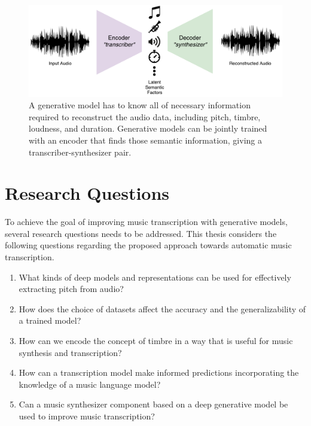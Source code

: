 \begin{figure}[t]
	\includegraphics[width=\textwidth]{autoencoder.pdf}
	\caption{A generative model has to know all of necessary information required to reconstruct the audio data, including pitch, timbre, loudness, and duration. Generative models can be jointly trained with an encoder that finds those semantic information, giving a transcriber-synthesizer pair.}
	\label{fig:autoencoder}
\end{figure}

\section{Research Questions}\label{sec:subproblems}

To achieve the goal of improving music transcription with generative models, several research questions needs to be addressed. This thesis considers the following questions regarding the proposed approach towards automatic music transcription.

\vspace{1em}

\begin{enumerate}
\item What kinds of deep models and representations can be used for effectively extracting pitch from audio?
\item How does the choice of datasets affect the accuracy and the generalizability of a trained model?
\item How can we encode the concept of timbre in a way that is useful for music synthesis and transcription?
\item How can a transcription model make informed predictions incorporating the knowledge of a music language model?
\item Can a music synthesizer component based on a deep generative model be used to improve music transcription?
\end{enumerate}

\vspace{1em}


